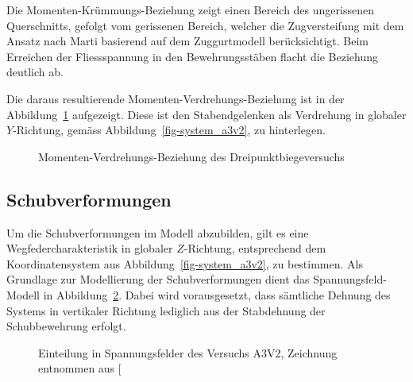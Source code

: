 \documentclass[
  11pt,
  letterpaper,
]{scrreprt}
\begin{document}
Die Momenten-Krümmungs-Beziehung zeigt einen Bereich des ungerissenen
Querschnitts, gefolgt vom gerissenen Bereich, welcher die Zugversteifung
mit dem Ansatz nach Marti basierend auf dem Zuggurtmodell
berücksichtigt. Beim Erreichen der Fliessspannung in den
Bewehrungsstäben flacht die Beziehung deutlich ab.

Die daraus resultierende Momenten-Verdrehungs-Beziehung ist in der
Abbildung~\ref{fig-mphi_a3v2} aufgezeigt. Diese ist den Stabendgelenken
als Verdrehung in globaler \(Y\)-Richtung, gemäss
Abbildung~\ref{fig-system_a3v2}, zu hinterlegen.

\begin{figure}[H]


\caption{\label{fig-mphi_a3v2}Momenten-Verdrehungs-Beziehung des
Dreipunktbiegeversuchs}

\end{figure}%

\subsection{Schubverformungen}\label{schubverformungen}

Um die Schubverformungen im Modell abzubilden, gilt es eine
Wegfedercharakteristik in globaler \(Z\)-Richtung, entsprechend dem
Koordinatensystem aus Abbildung~\ref{fig-system_a3v2}, zu bestimmen. Als
Grundlage zur Modellierung der Schubverformungen dient das
Spannungsfeld-Modell in Abbildung~\ref{fig-spannungsfelder_a3v2}. Dabei
wird vorausgesetzt, dass sämtliche Dehnung des Systems in vertikaler
Richtung lediglich aus der Stabdehnung der Schubbewehrung erfolgt.

\begin{figure}[H]


\caption{\label{fig-spannungsfelder_a3v2}Einteilung in Spannungsfelder
des Versuchs A3V2, Zeichnung entnommen aus
{[}\citeproc{ref-gitz_ansatze_2024}{1}{]}}

\end{figure}%
\end{document}
